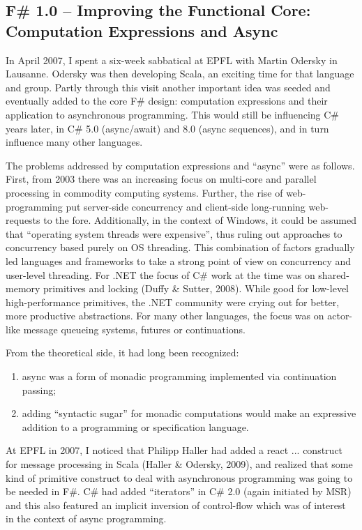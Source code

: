 \documentclass[acmsmall,review]{acmart}\settopmatter{printfolios=true,printccs=false,printacmref=false}
\begin{document}
\subsection*{F\# 1.0 – Improving the Functional Core: Computation Expressions and Async}

In April 2007, I spent a six-week sabbatical at EPFL with Martin Odersky in Lausanne.  Odersky was then developing Scala, an exciting time for that language and group. Partly through this visit another important idea was seeded and eventually added to the core F\# design: computation expressions and their application to asynchronous programming.  This would still be influencing C\# years later, in C\# 5.0 (async/await) and 8.0 (async sequences), and in turn influence many other languages. 

The problems addressed by computation expressions and “async” were as follows.  First, from 2003 there was an increasing focus on multi-core and parallel processing in commodity computing systems. Further, the rise of web-programming put server-side concurrency and client-side long-running web-requests to the fore. Additionally, in the context of Windows, it could be assumed that “operating system threads were expensive”, thus ruling out approaches to concurrency based purely on OS threading.  This combination of factors gradually led languages and frameworks to take a strong point of view on concurrency and user-level threading.  For .NET the focus of C\# work at the time was on shared-memory primitives and locking (Duffy \& Sutter, 2008). While good for low-level high-performance primitives, the .NET community were crying out for better, more productive abstractions.  For many other languages, the focus was on actor-like message queueing systems, futures or continuations.  

From the theoretical side, it had long been recognized:

\begin{enumerate}
\item async was a form of monadic programming implemented via continuation passing;
\item adding “syntactic sugar” for monadic computations would make an expressive addition to a programming or specification language.
\end{enumerate}


At EPFL in 2007, I noticed that Philipp Haller had added a react { ... } construct for message processing in Scala (Haller \& Odersky, 2009), and realized that some kind of primitive construct to deal with asynchronous programming was going to be needed in F\#.  C\# had added “iterators” in C\# 2.0 (again initiated by MSR) and this also featured an implicit inversion of control-flow which was of interest in the context of async programming.
\end{document}
